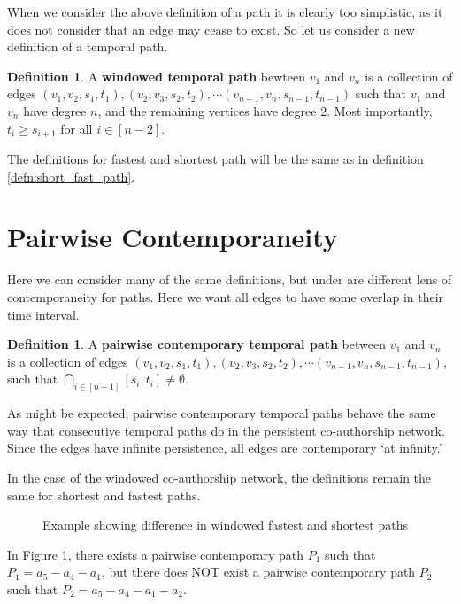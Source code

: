 \documentclass{article}
\theoremstyle{definition}
\newtheorem{defn}[thm]{Definition}
\numberwithin{thm}{subsection}
\begin{document}
When we consider the above definition of a path it is clearly too
simplistic, as it does not consider that an edge may cease to exist. So let
us consider a new definition of a temporal path.

\begin{defn}
  A \textbf{windowed temporal path} bewteen $v_1$ and $v_n$ is a collection of
  edges $(v_1,v_2,s_1,t_1),(v_2,v_3,s_2,t_2), \cdots (v_{n-1},v_{n}, s_{n-1},
  t_{n-1})$ such that $v_1$ and $v_n$ have degree $n$, and the remaining
  vertices have degree 2.  Most importantly, $t_i \geq s_{i+1}$ for all $i \in
  [n-2]$.
\end{defn}

The definitions for fastest and shortest path will be the same as in definition
\ref{defn:short_fast_path}.

\section{Pairwise Contemporaneity}

Here we can consider many of the same definitions, but under are different
lens of contemporaneity for paths. Here we want all edges to have some overlap
in their time interval.

\begin{defn}
  A \textbf{pairwise contemporary temporal path} between $v_1$ and $v_n$ is a
  collection of edges $(v_1,v_2,s_1,t_1), (v_2,v_3,s_2,t_2), \cdots (v_{n-1},
  v_n,s_{n-1}, t_{n-1})$, such that $\bigcap_{i \in [n-1]} [s_i, t_i]
  \neq \emptyset$.
\end{defn}

As might be expected, pairwise contemporary temporal paths behave the same way
that consecutive temporal paths do in the persistent co-authorship network.
Since the edges have infinite persistence, all edges are contemporary `at
infinity.'

In the case of the windowed co-authorship network, the definitions remain the
same for shortest and fastest paths.

\begin{figure}[h] \centering
  \caption{Example showing difference in windowed fastest and shortest paths}
  \label{fig:windowed_path_ex}
\end{figure}

In Figure \ref{fig:windowed_path_ex}, there exists a pairwise contemporary path
$P_1$ such that $P_1 = a_5-a_4-a_1$, but there does NOT exist a pairwise
contemporary path $P_2$ such that $P_2 = a_5-a_4-a_1-a_2$.
\end{document}
